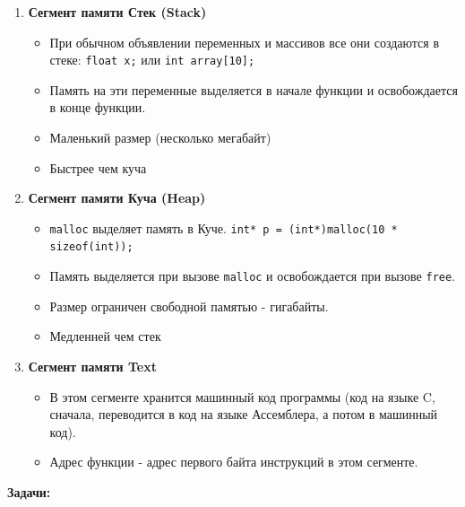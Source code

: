 \documentclass{article}
\begin{document}
\begin{enumerate}
\item \textbf{Сегмент памяти Стек (Stack)} \\
\begin{itemize}
\item При обычном объявлении переменных и массивов все они создаются в стеке: \texttt{float x;} или \texttt{int array[10];}
\item Память на эти переменные выделяется в начале функции и освобождается в конце функции.
\item Маленький размер (несколько мегабайт)
\item Быстрее чем куча
\end{itemize}
\item \textbf{Сегмент памяти Куча (Heap)} \\
\begin{itemize}
\item \texttt{malloc} выделяет память в Куче. \texttt{int* p = (int*)malloc(10 * sizeof(int));}
\item Память выделяется при вызове \texttt{malloc} и освобождается при вызове \texttt{free}.
\item Размер ограничен свободной памятью - гигабайты.
\item Медленней чем стек
\end{itemize}
\item \textbf{Сегмент памяти Text} \\
\begin{itemize}
\item В этом сегменте хранится машинный код программы (код на языке C, сначала, переводится в код на языке Ассемблера, а потом в машинный код).
\item Адрес функции - адрес первого байта инструкций в этом сегменте.
\end{itemize}
\end{enumerate}
\textbf{Задачи:}
\end{document}
